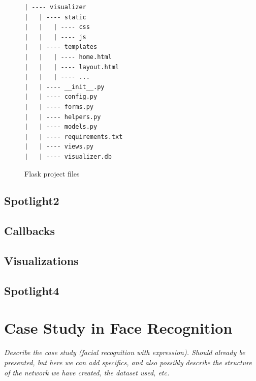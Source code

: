 \begin{figure}[h!]
\begin{verbatim}
| ---- visualizer
|   | ---- static
|   |   | ---- css
|   |   | ---- js
|   | ---- templates
|   |   | ---- home.html
|   |   | ---- layout.html
|   |   | ---- ...
|   | ---- __init__.py
|   | ---- config.py
|   | ---- forms.py
|   | ---- helpers.py
|   | ---- models.py
|   | ---- requirements.txt
|   | ---- views.py
|   | ---- visualizer.db
\end{verbatim}
\caption{Flask project files}
\label{struct}
\end{figure}

\subsection{Spotlight2}

\subsection{Callbacks}

\subsection{Visualizations}

\subsection{Spotlight4}

\section{Case Study in Face Recognition}

\textit{Describe the case study (facial recognition with expression).
Should already be presented, but here we can add specifics, and also possibly describe the structure of the network we have created, the dataset used, etc.}


\cleardoublepage